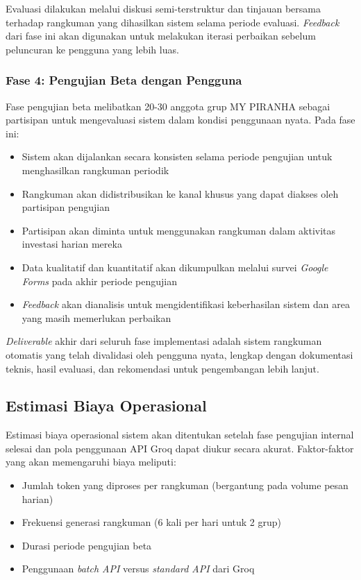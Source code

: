 Evaluasi dilakukan melalui diskusi semi-terstruktur dan tinjauan bersama terhadap rangkuman yang dihasilkan sistem selama periode evaluasi. \textit{Feedback} dari fase ini akan digunakan untuk melakukan iterasi perbaikan sebelum peluncuran ke pengguna yang lebih luas.

\subsubsection{Fase 4: Pengujian Beta dengan Pengguna}

Fase pengujian beta melibatkan 20-30 anggota grup MY PIRANHA sebagai partisipan untuk mengevaluasi sistem dalam kondisi penggunaan nyata. Pada fase ini:

\begin{itemize}
\item Sistem akan dijalankan secara konsisten selama periode pengujian untuk menghasilkan rangkuman periodik
\item Rangkuman akan didistribusikan ke kanal khusus yang dapat diakses oleh partisipan pengujian
\item Partisipan akan diminta untuk menggunakan rangkuman dalam aktivitas investasi harian mereka
\item Data kualitatif dan kuantitatif akan dikumpulkan melalui survei \textit{Google Forms} pada akhir periode pengujian
\item \textit{Feedback} akan dianalisis untuk mengidentifikasi keberhasilan sistem dan area yang masih memerlukan perbaikan
\end{itemize}

\textit{Deliverable} akhir dari seluruh fase implementasi adalah sistem rangkuman otomatis yang telah divalidasi oleh pengguna nyata, lengkap dengan dokumentasi teknis, hasil evaluasi, dan rekomendasi untuk pengembangan lebih lanjut.

\subsection{Estimasi Biaya Operasional}

Estimasi biaya operasional sistem akan ditentukan setelah fase pengujian internal selesai dan pola penggunaan API Groq dapat diukur secara akurat. Faktor-faktor yang akan memengaruhi biaya meliputi:

\begin{itemize}
\item Jumlah token yang diproses per rangkuman (bergantung pada volume pesan harian)
\item Frekuensi generasi rangkuman (6 kali per hari untuk 2 grup)
\item Durasi periode pengujian beta
\item Penggunaan \textit{batch API} versus \textit{standard API} dari Groq
\end{itemize}

